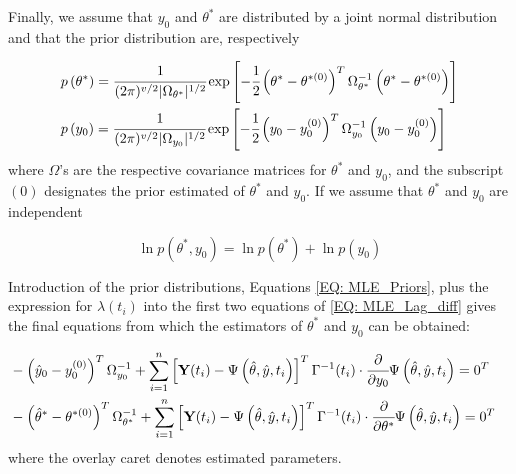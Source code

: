 \documentclass[a4paper,fleqn]{cas-dc}
\begin{document}
Finally, we assume that $y_0$ and $\theta^*$ are distributed by a joint normal distribution and that the prior distribution are, respectively

{\footnotesize
\begin{subequations} \label{EQ: MLE_Priors}
	\begin{align}
		&p\left( \theta^* \right) = \cfrac{1}{ (2\pi)^{v/2} |\Omega_{\theta^*}|^{1/2} } \exp \left[ -\cfrac{1}{2} \left( \theta^* - \theta^{*(0)} \right)^T \Omega_{\theta^*}^{-1} \left( \theta^* - \theta^{*(0)} \right) \right] \\
		&p\left( y_0 \right) = \cfrac{1}{ (2\pi)^{v/2} |\Omega_{y_0}|^{1/2} } \exp \left[ -\cfrac{1}{2} \left( y_0 - y_0^{(0)} \right)^T \Omega_{y_0}^{-1} \left( y_0 - y_0^{(0)} \right) \right] 
	\end{align}
\end{subequations} }
where $\Omega$'s are the respective covariance matrices for $\theta^*$ and $y_0$, and the subscript $(0)$ designates the prior estimated of $\theta^*$ and $y_0$. If we assume that $\theta^*$ and $y_0$ are independent

{\footnotesize
\begin{equation}
	\ln p(\theta^*,y_0) = \ln p(\theta^*) + \ln p(y_0)
\end{equation} }

Introduction of the prior distributions, Equations \ref{EQ: MLE_Priors}, plus the expression for $\lambda(t_i)$ into the first two equations of \ref{EQ: MLE_Lag_diff} gives the final equations from which the estimators of $\theta^*$ and $y_0$ can be obtained:

{\footnotesize
\begin{subequations} 
	\begin{flalign}
	&-\left( \hat{y}_0 - y_0^{(0)} \right)^T \Omega_{y_0}^{-1} + \sum_{i=1}^{n}\left[ \textbf{Y}(t_i) - \Psi\left( \hat{\theta}, \hat{y}, t_i \right) \right]^T \Gamma^{-1}(t_i) \cdot \cfrac{\partial}{\partial y_0} \Psi\left( \hat{\theta}, \hat{y}, t_i \right) = 0^T  &&\\
	&-\left( \hat{\theta}^* - \theta^{*(0)} \right)^T \Omega_{\theta^*}^{-1} + \sum_{i=1}^{n}\left[ \textbf{Y}(t_i) - \Psi\left( \hat{\theta}, \hat{y}, t_i \right) \right]^T \Gamma^{-1}(t_i) \cdot \cfrac{\partial}{\partial \theta^*} \Psi\left( \hat{\theta}, \hat{y}, t_i \right) = 0^T &&
	\end{flalign}
\end{subequations} }
where the overlay caret denotes estimated parameters.
\end{document}
